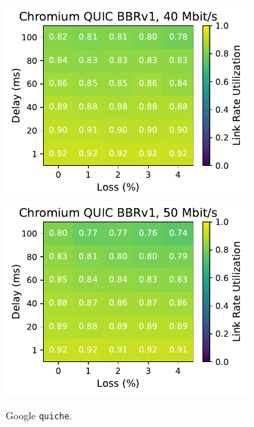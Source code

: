 \begin{figure}[ht]
\begin{subfigure}[b]{0.22\linewidth}
        \includegraphics[width=\linewidth,trim={0 0 2cm 0},clip]{splitting/figures/heatmaps/heatmap_quic_bbr1_40mbps.pdf}
        \includegraphics[width=\linewidth,trim={0 0 2cm 0},clip]{splitting/figures/heatmaps/heatmap_quic_bbr1_50mbps.pdf}
        \caption{Google \texttt{quiche}.}
    \end{subfigure}
    \begin{subfigure}[b]{0.22\linewidth}

\end{subfigure}
\end{figure}
